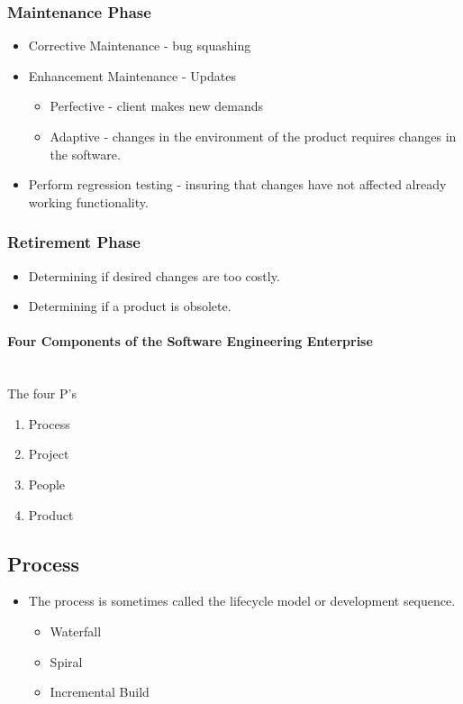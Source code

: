 \documentclass{report}
\begin{document}
		\subsubsection{Maintenance Phase}
			\begin{itemize}
				\item Corrective Maintenance - bug squashing
				\item Enhancement Maintenance - Updates
				\begin{itemize}
					\item Perfective - client makes new demands
					\item Adaptive - changes in the environment of the product requires changes in the software.
				\end{itemize}
				\item Perform regression testing - insuring that changes have not affected already working functionality.
			\end{itemize}
		\subsubsection{Retirement Phase}
			\begin{itemize}
				\item Determining if desired changes are too costly.
				\item Determining if a product is obsolete.
			\end{itemize}
	\paragraph{Four Components of the Software Engineering Enterprise}\\
	The four P's
	\begin{enumerate}
		\item Process
		\item Project
		\item People
		\item Product
	\end{enumerate}
	\subsection{Process}
		\begin{itemize}
			\item The process is sometimes called the lifecycle model or development sequence.
			\begin{itemize}
				\item Waterfall
				\item Spiral
				\item Incremental Build
			\end{itemize}
		\end{itemize}
\end{document}
